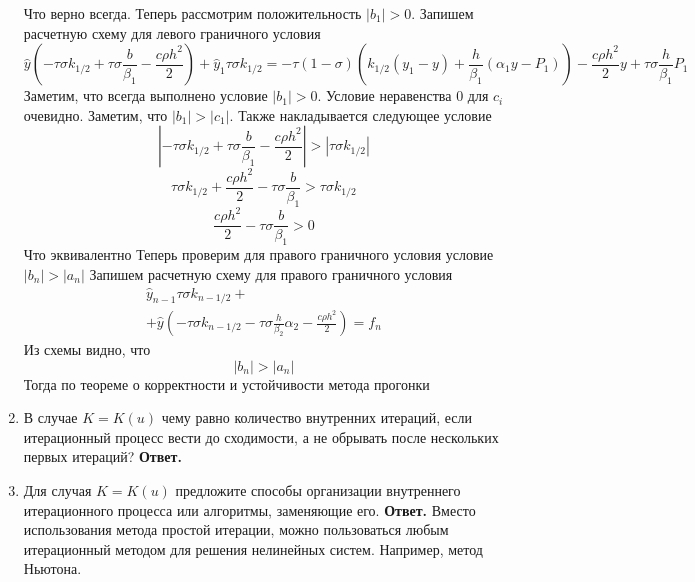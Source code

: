 \documentclass{article}
\begin{document}
\begin{enumerate}
\begin{equation*}
		\end{equation*}
		Что верно всегда. 
		Теперь рассмотрим положительность $|b_1| > 0$. Запишем расчетную схему для левого граничного условия
		\begin{equation*}
			\hat{y} (- \tau \sigma k_{1/2} + \tau \sigma \frac{b}{\beta_1} - \frac{c \rho h^2}{2}) + 
			\hat{y}_1 \tau \sigma k_{1/2} = -\tau (1-\sigma) (k_{1/2}(y_1 - y) + \frac{h}{\beta_1} (\alpha_1 y - P_1)) 
			- \frac{c \rho h^2}{2} y + \tau \sigma \frac{h}{\beta_1} P_1
		\end{equation*}
		Заметим, что всегда выполнено условие $|b_1| > 0$. 
		Условие неравенства 0 для $c_i$ очевидно. Заметим, что $|b_1| > |c_1|$.
		Также накладывается следующее условие
		\begin{equation*}
			|- \tau \sigma k_{1/2} + \tau \sigma \frac{b}{\beta_1} - \frac{c \rho h^2}{2}| > |\tau \sigma k_{1/2}|
		\end{equation*}
		\begin{equation*}
			\tau \sigma k_{1/2} +  \frac{c \rho h^2}{2} -\tau \sigma \frac{b}{\beta_1} >  \tau \sigma k_{1/2}
		\end{equation*}
		\begin{equation*}
			\frac{c \rho h^2}{2} -\tau \sigma \frac{b}{\beta_1} >0
		\end{equation*}
		Что эквивалентно 
		Теперь проверим для правого граничного условия условие $|b_n| > |a_n|$
		Запишем расчетную схему для правого граничного условия
		\begin{gather*}
			\hat{y}_{n-1} \tau \sigma k_{n-1/2} +\\+  \hat{y} (-\tau \sigma k_{n-1/2} - \tau \sigma \frac{h}{\beta_2} \alpha_2 - \frac{c \rho h^2}{2}) = 
			f_n
		\end{gather*}
		Из схемы видно, что 
		\begin{equation*}
			|b_n| > |a_n|
		\end{equation*}
		Тогда по теореме о корректности и устойчивости метода прогонки 
		\item В случае $K = K(u)$ чему равно количество внутренних итераций, если итерационный процесс вести до сходимости,
		а не обрывать после нескольких первых итераций?
		\newline
		{\bfseries Ответ. } 
		\item Для случая $K = K(u)$ предложите способы организации
		внутреннего итерационного процесса или алгоритмы, заменяющие его.
		\newline
		{\bfseries Ответ. } 
		Вместо использования метода простой итерации, можно пользоваться любым итерационный методом 
		для решения нелинейных систем. Например, метод Ньютона.
	\end{enumerate}
\end{document}
